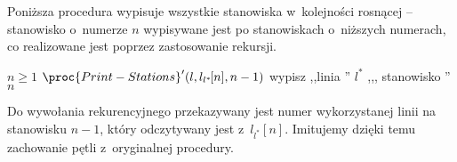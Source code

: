 
\exercise %
Poniższa procedura wypisuje wszystkie stanowiska w~kolejności rosnącej -- stanowisko o~numerze $n$ wypisywane jest po stanowiskach o~niższych numerach, co realizowane jest poprzez zastosowanie rekursji.
\begin{codebox}
\li	\If $n\ge1$
\li	\Then $\proc{Print-Stations}'(l,l_{l^*\!}[n],n-1)$
\li		wypisz ,,linia '' $l^*\!$ ,,{}, stanowisko '' $n$
	\End
\end{codebox}
Do wywołania rekurencyjnego przekazywany jest numer wykorzystanej linii na stanowisku $n-1$, który odczytywany jest z~$l_{l^*\!}[n]$.
Imitujemy dzięki temu zachowanie pętli z~oryginalnej procedury.

\exercise %
\exercise %
\exercise %
\exercise %
